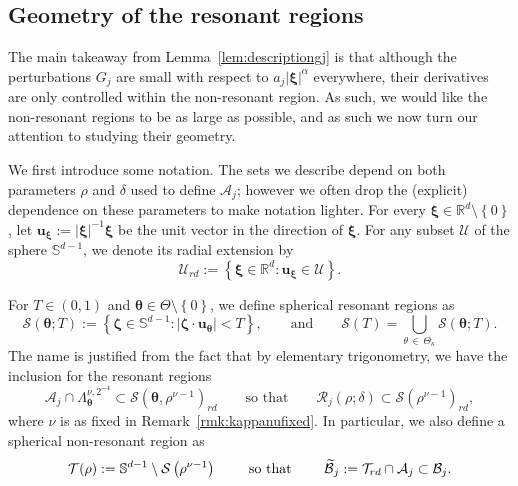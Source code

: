 \documentclass[10pt]{amsart}
\theoremstyle{definition}\newtheorem{defi}[theo]{Definition}\newtheorem{rema}[theo]{Remark}\newtheorem{exam}[theo]{Example}\newtheorem{nota}[theo]{Notation}
\newcommand{\R}{\mathbb R}
\newcommand{\BBS}{\mathbb S}
\newcommand{\CA}{\mathcal{A}}
\newcommand{\CB}{\mathcal{B}}
\newcommand{\CR}{\mathcal{R}}
\newcommand{\CS}{\mathcal{S}}
\newcommand{\CT}{\mathcal{T}}
\newcommand{\CU}{\mathcal{U}}
\newcommand{\btheta}{\boldsymbol \theta}
\newcommand{\bzeta}{\boldsymbol \zeta}
\newcommand{\bxi}{\boldsymbol \xi}
\newcommand{\bu}{\mathbf u}
\newcommand{\abs}[1]{\left\lvert #1 \right\rvert}
\newcommand{\set}[1]{\left\{ #1 \right\}}
\let\oldtilde\tilde
\renewcommand*{\tilde}[1]{\mathchoice{\widetilde{#1}}{\widetilde{#1}}{\oldtilde{#1}}{\oldtilde{#1}}}
\begin{document}
\subsection{Geometry of the resonant regions}

The main takeaway from Lemma~\ref{lem:descriptiongj} is that although the perturbations $G_j$ are small with respect to $a_j \abs \bxi^\alpha$ everywhere, their derivatives are only controlled within the non-resonant region. As such, we would like the non-resonant regions to be as large as possible, and as such we now turn our attention to studying their geometry.

We first introduce some notation. The sets we describe depend on both parameters $\rho$ and $\delta$ used to define $\CA_j$; however we often drop the (explicit) dependence on these parameters to make notation lighter. For every $\bxi \in \R^d \setminus \set 0$, let $\bu_{\bxi} := \abs \bxi^{-1}\bxi$ be the unit vector in the direction of $\bxi$. For any subset $\CU$ of the sphere $\BBS^{d-1}$, we denote its radial extension by
\[
\CU_{rd} := \set{\bxi \in \R^d : \bu_{\bxi} \in \CU}.
\]


For $T \in (0,1)$ and $\btheta \in
\Theta \setminus \set 0$, we define spherical resonant regions as
\begin{equation}
\CS(\btheta;T) := \set{\bzeta \in \BBS^{d-1} : \abs{\bzeta \cdot \bu_{\btheta}} < T}, \qquad \text{and} \qquad \CS(T) = \bigcup_{\theta\,\in\,\Theta_\kappa} \CS(\btheta;T).
\end{equation}
The name is justified from the fact that by elementary trigonometry, we have the inclusion for the resonant regions
\begin{equation}\label{eq:crjsub}
\CA_j \cap \Lambda^{\nu,2^{-4}}_{\btheta} \subset \CS\left(\btheta,\rho^{\nu - 1}\right)_{rd} \qquad
\text{so that} \qquad
\CR_j(\rho;\delta) \subset \CS\left(\rho^{\nu - 1}\right)_{rd},
\end{equation}
where $\nu$ is as fixed in Remark~\ref{rmk:kappanufixed}. In particular, we also define a spherical non-resonant region as
\begin{equation}
\CT(\rho) := \BBS^{d-1} \setminus \CS\left(\rho^{\nu - 1}\right)\qquad \text{ so that } \qquad
\tilde \CB_j := \CT_{rd} \cap \CA_j \subset \CB_j.
\end{equation}
\end{document}
